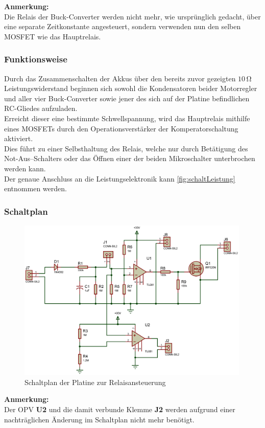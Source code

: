 \textbf{Anmerkung:}\\
Die Relais der Buck-Converter werden nicht mehr, wie ursprünglich gedacht, über eine separate Zeitkonstante angesteuert, sondern verwenden nun den selben MOSFET wie das Hauptrelais. 

\newpage
\subsubsection{Funktionsweise}
Durch das Zusammenschalten der Akkus über den bereits zuvor gezeigten $10\,\mathrm{\Omega}$ Leistungswiderstand beginnen sich sowohl die Kondensatoren beider Motorregler und aller vier Buck-Converter sowie jener des sich auf der Platine befindlichen RC-Gliedes aufzuladen.\\
Erreicht dieser eine bestimmte Schwellspannung, wird das Hauptrelais mithilfe eines MOSFETs durch den Operationsverstärker der Komperatorschaltung aktiviert.\\
Dies führt zu einer Selbsthaltung des Relais, welche nur durch Betätigung des Not-Aus--Schalters oder das Öffnen einer der beiden Mikroschalter unterbrochen werden kann.\\
Der genaue Anschluss an die Leistungselektronik kann \autoref{fig:schaltLeistung} entnommen werden.
\subsubsection{Schaltplan}
\begin{figure}[h]
    \centering
    \includegraphics[width=0.99\textwidth]{../Proteus/Exports/Relaisansteuerung.png}
    \caption{Schaltplan der Platine zur Relaisansteuerung\label{fig:plat:relais}}
\end{figure}
\textbf{Anmerkung:}\\
Der OPV \textbf{U2} und die damit verbunde Klemme \textbf{J2} werden aufgrund einer nachträglichen Änderung im Schaltplan nicht mehr benötigt.
\newpage

